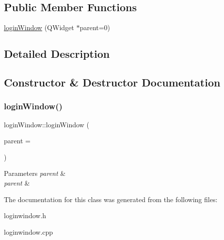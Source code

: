 \subsection*{Public Member Functions}
\begin{DoxyCompactItemize}
\item 
\hyperlink{classlogin_window_ad6f2de3f9d45e1f951a2eb2eeed9747e}{login\+Window} (Q\+Widget $\ast$parent=0)
\end{DoxyCompactItemize}


\subsection{Detailed Description}

\begin{DoxyItemize}
\item 
\end{DoxyItemize}

\subsection{Constructor \& Destructor Documentation}
\mbox{\label{classlogin_window_ad6f2de3f9d45e1f951a2eb2eeed9747e}} 
\subsubsection{\texorpdfstring{login\+Window()}{loginWindow()}}
{\footnotesize\ttfamily login\+Window\+::login\+Window (\begin{DoxyParamCaption}\item[{Q\+Widget $\ast$}]{parent = {} }\end{DoxyParamCaption})\hspace{0.3cm}{\ttfamily [explicit]}}


\begin{DoxyItemize}
\item 
\begin{DoxyParams}{Parameters}
{\em parent} & \\
\hline
{\em parent} & \\
\hline
\end{DoxyParams}

\end{DoxyItemize}

The documentation for this class was generated from the following files\+:\begin{DoxyCompactItemize}
\item 
loginwindow.\+h\item 
loginwindow.\+cpp\end{DoxyCompactItemize}
